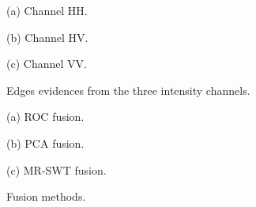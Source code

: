\documentclass{article}
\begin{document}
\begin{figure}[H]
    \begin{minipage}{0.5\textwidth}
       \begin{minipage}[b]{.32\linewidth}
  \centering
 \centerline{}
  \vspace{-0.1cm}
  \centerline{\small{(a) Channel HH.}}\medskip
\end{minipage}
\begin{minipage}[b]{.31\linewidth}
  \centering
\centerline{}
  \vspace{-0.1cm}
  \centerline{\small{(b) Channel HV.}}\medskip
\end{minipage}
\begin{minipage}[b]{0.31\linewidth}
  \centering
 \centerline{}
  \vspace{-0.1cm}
  \centerline{\small{(c) Channel VV.}}\medskip
\end{minipage}\vspace{-0.3cm}
       \caption{Edges evidences from the three intensity channels.}
\label{fig:res}
    \end{minipage}%
\end{figure}
\vspace{-0.4cm}
\begin{figure}[H]
    \begin{minipage}{0.5\textwidth}
       \begin{minipage}[b]{.32\linewidth}
  \centering
 \centerline{}
  \vspace{-0.1cm}
  \centerline{\small{(a) ROC fusion.}}\medskip
\end{minipage}
\begin{minipage}[b]{.31\linewidth}
  \centering
\centerline{}
  \vspace{-0.1cm}
  \centerline{\small{(b) PCA fusion.}}\medskip
\end{minipage}
\begin{minipage}[b]{0.31\linewidth}
 \centerline{}
  \vspace{-0.1cm}
  \centerline{\small{(c) MR-SWT fusion.}}\medskip
\end{minipage}\vspace{-0.3cm}
       \caption{Fusion methods.}
\label{fig:fus}
    \end{minipage}%
\end{figure}\vspace{-0.2cm}
\end{document}
